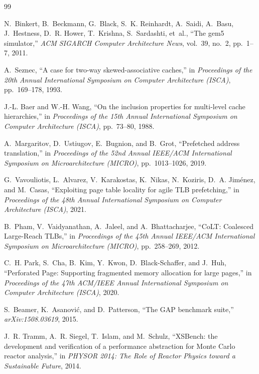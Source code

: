 \documentclass[11pt,a4paper]{article}
\begin{document}
\begin{thebibliography}{99}

N.~Binkert, B.~Beckmann, G.~Black, S.~K. Reinhardt, A.~Saidi, A.~Basu, J.~Hestness, D.~R. Hower, T.~Krishna, S.~Sardashti, et~al.,
\newblock ``The gem5 simulator,''
\newblock \textit{ACM SIGARCH Computer Architecture News}, vol.~39, no.~2, pp.~1--7, 2011.

A.~Seznec,
\newblock ``A case for two-way skewed-associative caches,''
\newblock in \textit{Proceedings of the 20th Annual International Symposium on Computer Architecture (ISCA)}, pp.~169--178, 1993.

J.-L. Baer and W.-H. Wang,
\newblock ``On the inclusion properties for multi-level cache hierarchies,''
\newblock in \textit{Proceedings of the 15th Annual International Symposium on Computer Architecture (ISCA)}, pp.~73--80, 1988.

A.~Margaritov, D.~Ustiugov, E.~Bugnion, and B.~Grot,
\newblock ``Prefetched address translation,''
\newblock in \textit{Proceedings of the 52nd Annual IEEE/ACM International Symposium on Microarchitecture (MICRO)}, pp.~1013--1026, 2019.

G.~Vavouliotis, L.~Alvarez, V.~Karakostas, K.~Nikas, N.~Koziris, D.~A. Jim\'enez, and M.~Casas,
\newblock ``Exploiting page table locality for agile TLB prefetching,''
\newblock in \textit{Proceedings of the 48th Annual International Symposium on Computer Architecture (ISCA)}, 2021.

B.~Pham, V.~Vaidyanathan, A.~Jaleel, and A.~Bhattacharjee,
\newblock ``CoLT: Coalesced Large-Reach TLBs,''
\newblock in \textit{Proceedings of the 45th Annual IEEE/ACM International Symposium on Microarchitecture (MICRO)}, pp.~258--269, 2012.

C.~H. Park, S.~Cha, B.~Kim, Y.~Kwon, D.~Black-Schaffer, and J.~Huh,
\newblock ``Perforated Page: Supporting fragmented memory allocation for large pages,''
\newblock in \textit{Proceedings of the 47th ACM/IEEE Annual International Symposium on Computer Architecture (ISCA)}, 2020.

S.~Beamer, K.~Asanovi\'c, and D.~Patterson,
\newblock ``The GAP benchmark suite,''
\newblock \textit{arXiv:1508.03619}, 2015.

J.~R. Tramm, A.~R. Siegel, T.~Islam, and M.~Schulz,
\newblock ``XSBench: the development and verification of a performance abstraction for Monte Carlo reactor analysis,''
\newblock in \textit{PHYSOR 2014: The Role of Reactor Physics toward a Sustainable Future}, 2014.


\end{thebibliography}
\end{document}
